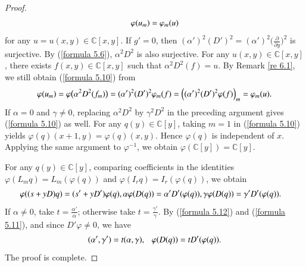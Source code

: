 \documentclass[12pt,reqno]{amsart}
\def\C{\mathbb{C}}
\numberwithin{equation}{section}
\begin{document}
\begin{proof}
\begin{equation}\label{formula 5.10}
\aligned
 \varphi(u_m)=\varphi_m(u)  
\endaligned
\end{equation}
for any $u=u(x,y)\in\C[x,y]$.
If $g'=0$, then $(\alpha')^2(D')^2=(\alpha')^2\Big(\frac{\partial}{\partial{y}}\Big)^2$ is surjective. By (\ref{formula 5.6}), $\alpha^2D^2$ is also surjective. For any $u(x,y)\in\C[x,y]$, there exists $f(x,y)\in\C[x,y]$ such that $\alpha^2D^2(f)=u$. By Remark \ref{re 6.1}, we still obtain (\ref{formula 5.10}) from
\begin{equation*}
\aligned
 \varphi(u_m)=\varphi\big(\alpha^2D^2(f_m)\big)=(\alpha')^2(D')^2\varphi_m(f)=\Big(   (\alpha')^2(D')^2\varphi(f) \Big)_m=\varphi_m(u).
\endaligned
\end{equation*}
If $\alpha=0$ and $\gamma\neq 0$, replacing $\alpha^2D^2$ by $\gamma^2D^2$ in the preceding argument gives (\ref{formula 5.10}) as well. 
For any $q(y)\in\mathbb C[y]$, taking $m=1$ in (\ref{formula 5.10}) yields $\varphi(q)(x+1,y)=\varphi(q)(x,y)$. Hence $\varphi(q)$ is independent of $x$. Applying the same argument to $\varphi^{-1}$, we obtain $\varphi(\mathbb C[y])=\mathbb C[y]$.

For any $q(y)\in\mathbb C[y]$,
comparing coefficients in the identities
$\varphi(L_mq)=L_m(\varphi(q))$ and $\varphi(I_rq)=I_r(\varphi(q))$, we obtain
\begin{equation}\label{formula 5.11}
\aligned
 \varphi((s+yD)q)&=(s'+yD')\varphi(q),\alpha\varphi(D(q))=\alpha'D'(\varphi(q)), \gamma\varphi(D(q))=\gamma'D'(\varphi(q)).
\endaligned
\end{equation}
If $\alpha\neq0$, take $t=\frac{\alpha'}{\alpha}$; otherwise take $t=\frac{\gamma'}{\gamma}$.
By (\ref{formula 5.12}) and (\ref{formula 5.11}), and since $D'\varphi\neq0$, we have
\begin{equation}\label{formula 5.13}
\aligned
 (\alpha',\gamma')=t(\alpha,\gamma),\ \ \ \varphi(D(q))=tD'(\varphi(q)).
\endaligned
\end{equation}
The proof is complete.
\end{proof}
\end{document}
